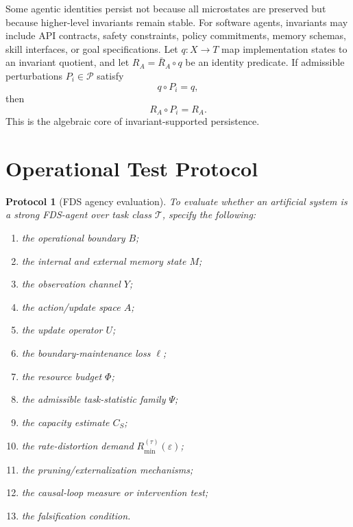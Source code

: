 \documentclass[10pt,a4paper,twocolumn,aps,prl]{revtex4-2}
\newtheorem{protocol}{Protocol}
\begin{document}
Some agentic identities persist not because all microstates are preserved but because higher-level invariants remain stable. For software agents, invariants may include API contracts, safety constraints, policy commitments, memory schemas, skill interfaces, or goal specifications. Let $q:X\to T$ map implementation states to an invariant quotient, and let $R_A=\bar R_A\circ q$ be an identity predicate. If admissible perturbations $P_i\in\mathcal{P}$ satisfy
\begin{equation}
q\circ P_i=q,
\end{equation}
then
\begin{equation}
R_A\circ P_i=R_A.
\end{equation}
This is the algebraic core of invariant-supported persistence.

\section{Operational Test Protocol}

\begin{protocol}[FDS agency evaluation]
To evaluate whether an artificial system is a strong FDS-agent over task class $\mathcal{T}$, specify the following:
\begin{enumerate}[leftmargin=2em]
    \item the operational boundary $B$;
    \item the internal and external memory state $M$;
    \item the observation channel $Y$;
    \item the action/update space $A$;
    \item the update operator $U$;
    \item the boundary-maintenance loss $\ell$;
    \item the resource budget $\Phi$;
    \item the admissible task-statistic family $\Psi$;
    \item the capacity estimate $C_S$;
    \item the rate-distortion demand $R_{\min}^{(\tau)}(\varepsilon)$;
    \item the pruning/externalization mechanisms;
    \item the causal-loop measure or intervention test;
    \item the falsification condition.
\end{enumerate}
\end{protocol}
\end{document}
